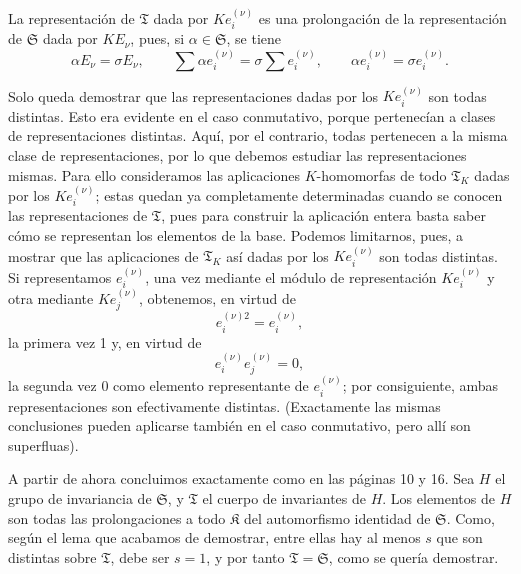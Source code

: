 La representación de \(\mathfrak T\) dada por \(K e_i^{(\nu)}\) es una prolongación de la representación de \(\mathfrak S\) dada por \(K E_\nu\), pues, si \(\alpha\in\mathfrak S\), se tiene
\[
\alpha E_\nu=\sigma E_\nu,\qquad
\sum \alpha e_i^{(\nu)}=\sigma\sum e_i^{(\nu)},\qquad
\alpha e_i^{(\nu)}=\sigma e_i^{(\nu)}.
\]

Solo queda demostrar que las representaciones dadas por los \(K e_i^{(\nu)}\) son todas distintas. Esto era evidente en el caso conmutativo, porque pertenecían a clases de representaciones distintas. Aquí, por el contrario, todas pertenecen a la misma clase de representaciones, por lo que debemos estudiar las representaciones mismas. Para ello consideramos las aplicaciones \(K\)-homomorfas de todo \(\mathfrak T_K\) dadas por los \(K e_i^{(\nu)}\); estas quedan ya completamente determinadas cuando se conocen las representaciones de \(\mathfrak T\), pues para construir la aplicación entera basta saber cómo se representan los elementos de la base. Podemos limitarnos, pues, a mostrar que las aplicaciones de \(\mathfrak T_K\) así dadas por los \(K e_i^{(\nu)}\) son todas distintas. Si representamos \(e_i^{(\nu)}\), una vez mediante el módulo de representación \(K e_i^{(\nu)}\) y otra mediante \(K e_j^{(\nu)}\), obtenemos, en virtud de
\[
e_i^{(\nu)2}=e_i^{(\nu)},
\]
la primera vez 1 y, en virtud de
\[
e_i^{(\nu)}e_j^{(\nu)}=0,
\]
la segunda vez 0 como elemento representante de \(e_i^{(\nu)}\); por consiguiente, ambas representaciones son efectivamente distintas. (Exactamente las mismas conclusiones pueden aplicarse también en el caso conmutativo, pero allí son superfluas).

A partir de ahora concluimos exactamente como en las páginas 10 y 16. Sea \(H\) el grupo de invariancia de \(\mathfrak S\), y \(\mathfrak T\) el cuerpo de invariantes de \(H\). Los elementos de \(H\) son todas las prolongaciones a todo \(\mathfrak K\) del automorfismo identidad de \(\mathfrak S\). Como, según el lema que acabamos de demostrar, entre ellas hay al menos \(s\) que son distintas sobre \(\mathfrak T\), debe ser \(s=1\), y por tanto \(\mathfrak T=\mathfrak S\), como se quería demostrar.

